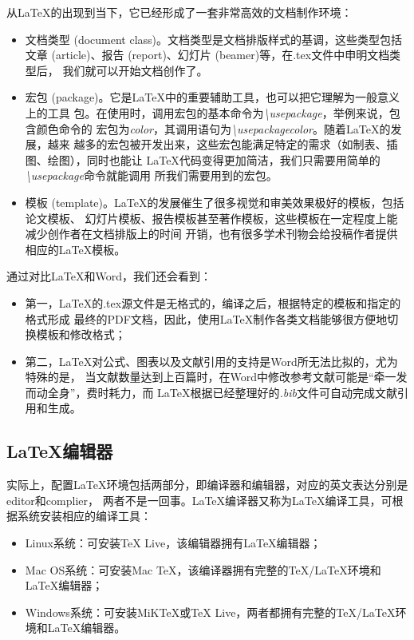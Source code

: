 从LaTeX的出现到当下，它已经形成了一套非常高效的文档制作环境：
\begin{itemize}
      \item 文档类型 (document class)。文档类型是文档排版样式的基调，这些类型包括
            文章 (article)、报告 (report)、幻灯片 (beamer)等，在.tex文件中申明文档类型后，
            我们就可以开始文档创作了。
      \item 宏包 (package)。它是LaTeX中的重要辅助工具，也可以把它理解为一般意义上的工具
            包。在使用时，调用宏包的基本命令为\emph{\textbackslash usepackage{}}，举例来说，包含颜色命令的
            宏包为\emph{color}，其调用语句为\emph{\textbackslash usepackage{color}}。随着LaTeX的发展，越来
            越多的宏包被开发出来，这些宏包能满足特定的需求（如制表、插图、绘图），同时也能让
            LaTeX代码变得更加简洁，我们只需要用简单的\emph{\textbackslash usepackage{}}命令就能调用
            所我们需要用到的宏包。
      \item 模板 (template)。LaTeX的发展催生了很多视觉和审美效果极好的模板，包括论文模板、
            幻灯片模板、报告模板甚至著作模板，这些模板在一定程度上能减少创作者在文档排版上的时间
            开销，也有很多学术刊物会给投稿作者提供相应的LaTeX模板。
\end{itemize}

通过对比LaTeX和Word，我们还会看到：
\begin{itemize}
      \item 第一，LaTeX的.tex源文件是无格式的，编译之后，根据特定的模板和指定的格式形成
            最终的PDF文档，因此，使用LaTeX制作各类文档能够很方便地切换模板和修改格式；
      \item 第二，LaTeX对公式、图表以及文献引用的支持是Word所无法比拟的，尤为特殊的是，
            当文献数量达到上百篇时，在Word中修改参考文献可能是“牵一发而动全身”，费时耗力，而
            LaTeX根据已经整理好的\emph{.bib}文件可自动完成文献引用和生成。
\end{itemize}

\subsection{\LaTeX 编辑器}
实际上，配置LaTeX环境包括两部分，即编译器和编辑器，对应的英文表达分别是editor和complier，
两者不是一回事。LaTeX编译器又称为LaTeX编译工具，可根据系统安装相应的编译工具：
\begin{itemize}
      \item Linux系统：可安装TeX Live，该编辑器拥有LaTeX编辑器；
      \item Mac OS系统：可安装Mac TeX，该编译器拥有完整的TeX/LaTeX环境和LaTeX编辑器；
      \item Windows系统：可安装MiKTeX或TeX Live，两者都拥有完整的TeX/LaTeX环境和LaTeX编辑器。
\end{itemize}

